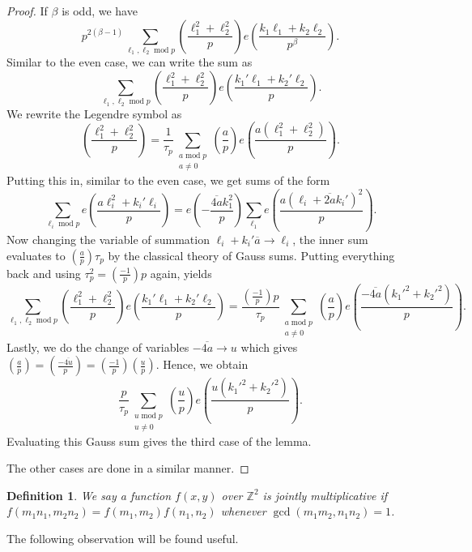 \documentclass[12pt]{amsart}
\def\Z{\mathbb{Z}}
\newtheorem{definition}[theorem]{Definition}
\def\Z{\mathbb Z}
\def\Z{\mathbb Z}
\def\mod{\operatorname{mod}}
\def\gcd{\operatorname{gcd}}
\begin{document}
\begin{proof}
    If $\beta$ is odd, we have
    $$ p^{2(\beta-1)} \sum_{\ell_1 , \ell_2 \mod p} \left( \frac{\ell_1^2+\ell_2^2}{p} \right) e\left( \frac{k_1 \ell_1 + k_2 \ell_2}{p^{\beta}} \right) . $$
    Similar to the even case, we can write the sum as
    $$ \sum_{\ell_1 , \ell_2 \mod p} \left( \frac{\ell_1^2+\ell_2^2}{p} \right) e\left( \frac{k_1' \ell_1 + k_2' \ell_2}{p} \right) .$$
    We rewrite the Legendre symbol as
    $$ \left( \frac{\ell_1^2+\ell_2^2}{p} \right) = \frac{1}{\tau_p} \sum_{\substack{a \mod p \\ a\not=0}} \left( \frac{a}{p}\right) e\left( \frac{a(\ell_1^2+\ell_2^2)}{p} \right) . $$
    Putting this in, similar to the even case, we get sums of the form
    $$ \sum_{\ell_i \mod p} e\left( \frac{a\ell_i^2 + k_i' \ell_i}{p} \right) = e\left( - \frac{\overline{4a}k_1^2}{p} \right) \sum_{\ell_1} e\left( \frac{a(\ell_i + \overline{2a} k_i')^2}{p} \right). $$
    Now changing the variable of summation $\ell_i + k_i' \overline{a} \to \ell_i$, the inner sum evaluates to $\left( \frac{a}{p} \right)\tau_p$ by the classical theory of Gauss sums. Putting everything back and using $\tau_p^2 = \left( \frac{-1}{p} \right)p $ again, yields
    $$ \sum_{\ell_1 , \ell_2 \mod p} \left( \frac{\ell_1^2+\ell_2^2}{p} \right) e\left( \frac{k_1' \ell_1 + k_2' \ell_2}{p} \right) = \frac{\left(\frac{-1}{p} \right) p}{\tau_p} \sum_{\substack{a \mod p \\ a\not=0}} \left( \frac{a}{p} \right) e\left( \frac{-\overline{4a}(k_1'^2+k_2'^2)}{p} \right) .$$
    Lastly, we do the change of variables $-\overline{4a} \to u$ which gives $\left( \frac{a}{p} \right) = \left( \frac{-\overline{4u}}{p} \right) = \left( \frac{-1}{p} \right)\left( \frac{u}{p} \right)$. Hence, we obtain
    $$ \frac{p}{\tau_p} \sum_{\substack{u \mod p \\ u\not=0}} \left(\frac{u}{p} \right) e\left( \frac{u(k_1'^2+k_2'^2)}{p} \right) .$$
    Evaluating this Gauss sum gives the third case of the lemma.

    The other cases are done in a similar manner.
\end{proof}

\begin{definition}
 We say a function $f(x,y)$ over $\Z^2$ is jointly multiplicative if $f(m_1n_1,m_2n_2)=f(m_1,m_2)f(n_1,n_2)$ whenever $\gcd(m_1m_2,n_1n_2)=1$.
 \end{definition}
 The following observation will be found useful.
\end{document}
